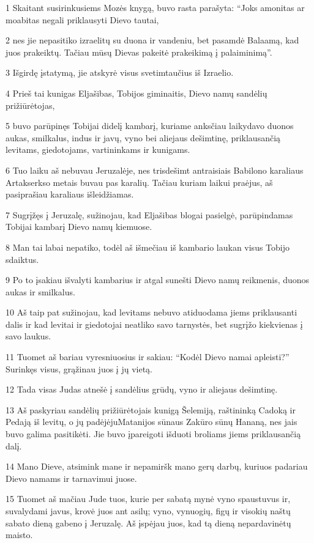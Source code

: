 \par 1 Skaitant susirinkusiems Mozės knygą, buvo rasta parašyta: “Joks amonitas ar moabitas negali priklausyti Dievo tautai, 
\par 2 nes jie nepasitiko izraelitų su duona ir vandeniu, bet pasamdė Balaamą, kad juos prakeiktų. Tačiau mūsų Dievas pakeitė prakeikimą į palaiminimą”. 
\par 3 Išgirdę įstatymą, jie atskyrė visus svetimtaučius iš Izraelio. 
\par 4 Prieš tai kunigas Eljašibas, Tobijos giminaitis, Dievo namų sandėlių prižiūrėtojas, 
\par 5 buvo parūpinęs Tobijai didelį kambarį, kuriame anksčiau laikydavo duonos aukas, smilkalus, indus ir javų, vyno bei aliejaus dešimtinę, priklausančią levitams, giedotojams, vartininkams ir kunigams. 
\par 6 Tuo laiku aš nebuvau Jeruzalėje, nes trisdešimt antraisiais Babilono karaliaus Artakserkso metais buvau pas karalių. Tačiau kuriam laikui praėjus, aš pasiprašiau karaliaus išleidžiamas. 
\par 7 Sugrįžęs į Jeruzalę, sužinojau, kad Eljašibas blogai pasielgė, parūpindamas Tobijai kambarį Dievo namų kiemuose. 
\par 8 Man tai labai nepatiko, todėl aš išmečiau iš kambario laukan visus Tobijo sdaiktus. 
\par 9 Po to įsakiau išvalyti kambarius ir atgal sunešti Dievo namų reikmenis, duonos aukas ir smilkalus. 
\par 10 Aš taip pat sužinojau, kad levitams nebuvo atiduodama jiems priklausanti dalis ir kad levitai ir giedotojai neatliko savo tarnystės, bet sugrįžo kiekvienas į savo laukus. 
\par 11 Tuomet aš bariau vyresniuosius ir sakiau: “Kodėl Dievo namai apleisti?” Surinkęs visus, grąžinau juos į jų vietą. 
\par 12 Tada visas Judas atnešė į sandėlius grūdų, vyno ir aliejaus dešimtinę. 
\par 13 Aš paskyriau sandėlių prižiūrėtojais kunigą Šelemiją, raštininką Cadoką ir Pedają iš levitų, o jų padėjėju­Matanijos sūnaus Zakūro sūnų Hananą, nes jais buvo galima pasitikėti. Jie buvo įpareigoti išduoti broliams jiems priklausančią dalį. 
\par 14 Mano Dieve, atsimink mane ir nepamiršk mano gerų darbų, kuriuos padariau Dievo namams ir tarnavimui juose. 
\par 15 Tuomet aš mačiau Jude tuos, kurie per sabatą mynė vyno spaustuvus ir, suvalydami javus, krovė juos ant asilų; vyno, vynuogių, figų ir visokių naštų sabato dieną gabeno į Jeruzalę. Aš įspėjau juos, kad tą dieną nepardavinėtų maisto. 
